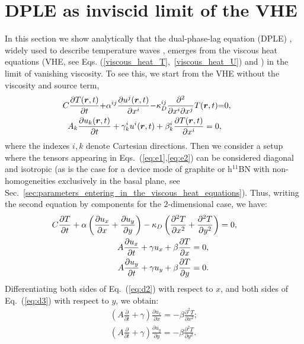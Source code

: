\documentclass[
prb,
twocolumn,
superscriptaddress,
 amsmath,amssymb,
 aps,
longbibliography,
]{revtex4-2}
\begin{document}
\section{DPLE as inviscid limit of the VHE}
\label{sec:DPLE_derivation}
In this section we show analytically that the dual-phase-lag equation (DPLE) \cite{joseph_heat_1989,tzou_unified_1995}, widely used to describe temperature waves \cite{xu_thermal_2002,ordonez-miranda_exact_2010,kang_method_2017,gandolfi_accessing_2019,xu_thermal_2021,mazza_thermal_2021}, emerges from the viscous heat equations (VHE, see Eqs. (\ref{viscous_heat_T},~\ref{viscous_heat_U}) and \cite{Simoncelli2020}) in the limit of vanishing viscosity.
To see this, we start from the VHE without the viscosity and source term,
\begin{eqnarray}
C\frac{\partial T(\bm{r},t)}{\partial t} {+} \alpha^{ij}\frac{\partial u^j(\bm{r},t)}{\partial x^i}{-}  \kappa_D^{ij}\frac{\partial^2}{\partial x^i \partial x^j} T(\bm{r},t) {=} 0,\hspace*{6mm}\label{eq:e1}
\\
A_k\frac{\partial u_k(\bm{r},t)}{\partial t} + \gamma^i_k u^i(\bm{r},t) + \beta^i_k\frac{\partial T(\bm{r},t)}{\partial x^i}= 0,\hspace*{10mm}\label{eq:e2}
\end{eqnarray}
where the indexes $i,k$ denote Cartesian directions.
Then we consider a setup where the tensors appearing in Eqs.~(\ref{eq:e1},\ref{eq:e2}) can be considered diagonal and isotropic (as is the case for a device mode of graphite or h$^{11}$BN with non-homogeneities exclusively in the basal plane, see Sec.~\ref{sec:parameters_entering_in_the_viscous_heat_equations}).
Thus, writing the second equation by components for the $2$-dimensional case, we have:
\begin{eqnarray}
C\frac{\partial T}{\partial t}+ \alpha\left(\frac{\partial u_x}{\partial x} + \frac{\partial u_y}{\partial y}\right) - \kappa_D\left(\frac{\partial^2 T}{\partial x^2} + \frac{\partial^2 T}{\partial y^2}\right) = 0,\label{eq:d1} \hspace*{8mm}\\
A\frac{\partial u_x}{\partial t} + \gamma u_x + \beta\frac{\partial T}{\partial x} = 0,\label{eq:d2}\hspace*{20mm}\\
A\frac{\partial u_y}{\partial t} + \gamma u_y + \beta\frac{\partial T}{\partial y} = 0.\label{eq:d3}\hspace*{20mm}
\end{eqnarray}
Differentiating both sides of Eq.~(\ref{eq:d2}) with respect to $x$, and both sides of Eq.~(\ref{eq:d3}) with respect to $y$, we obtain:
\begin{eqnarray}
\left(A\frac{\partial}{\partial t} + \gamma\right) \frac{\partial u_x}{\partial x}  = - \beta\frac{\partial^2 T}{\partial x^2} \label{eq:bf1}; \\
\left(A\frac{\partial}{\partial t} + \gamma\right) \frac{\partial u_y}{\partial y}  = - \beta\frac{\partial^2 T}{\partial y^2}\label{eq:bf2}.
\end{eqnarray}
\end{document}
